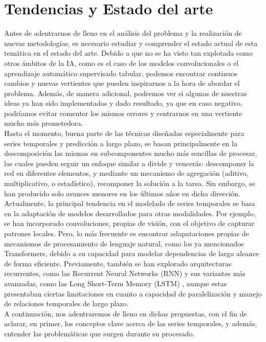 \chapter{Tendencias y Estado del arte}

Antes de adentrarnos de lleno en el análisis del problema y la realización de nuevas metodologías, es necesario estudiar y comprender el estado actual de esta temática en el estado del arte. Debido a que no se ha visto tan explotada como otros ámbitos de la IA, como es el caso de los modelos convolucionales o el aprendizaje automático supervisado tabular, podemos encontrar continuos cambios y nuevas vertientes que pueden inspirarnos a la hora de abordar el problema. Además, de manera adicional, podremos ver si algunas de nuestras ideas ya han sido implementadas y dado resultado, ya que en caso negativo, podríamos evitar comenter los mismos errores y centrarnos en una vertiente mucho más prometedora.\\

Hasta el momento, buena parte de las técnicas diseñadas especialmente para series temporales y predicción a largo plazo, se basan principalmente en la descomposición las mismas en subcomponentes mucho más sencillas de procesar, las cuales pueden seguir un enfoque similar a divide y vencerás: descomponer la red en diferentes elementos, y mediante un mecanismo de agregación (aditivo, multiplicativo, o estadístico), recomponer la solución a la tarea. Sin embargo, se han producido solo avances menores en los últimos años en dicha dirección. \\

Actualmente, la principal tendencia en el modelado de series temporales se basa en la adaptación de modelos desarrollados para otras modalidades. Por ejemplo, se han incorporado convoluciones, propias de visión, con el objetivo de capturar patrones locales. Pero, lo más frecuente es encontrar adapataciones propias de mecanismos de procesamiento de lenguaje natural, como los ya mencionados Transformers, debido a su capacidad para modelar dependencias de largo alcance de forma eficiente. Previamente, también se han explorado arquitecturas recurrentes, como las Recurrent Neural Networks (RNN) y sus variantes más avanzadas, como las Long Short-Term Memory (LSTM) \cite{6795963}, aunque estas presentaban ciertas limitaciones en cuanto a capacidad de paralelización y manejo de relaciones temporales de largo plazo.\\

A continuación, nos adentraremos de lleno en dichas propuestas, con el fin de aclarar, en primer, los conceptos clave acerca de las series temporales, y además, entender las problemáticas que surgen durante su procesado.


